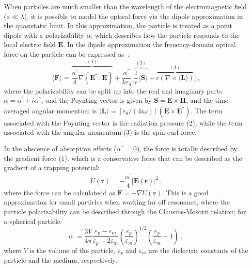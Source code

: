 When particles are much smaller than the wavelength of the electromagnetic field ($s\ll \lambda$), it is possible to model the optical force via the dipole approximation in the
quasistatic limit. In this approximation, the particle is treated as a point dipole with a polarizability $\alpha$, which describes how the particle responds to the local electric field $\mathbf{E}$.
In the dipole approximation the freuency-domain optical force on the particle can be expressed as~\cite{novotny}:
\begin{equation}
    \langle\mathbf{F}\rangle=\overbrace{\frac{\alpha^{\prime}}{4} \nabla\left\{\mathbf{E}^* \cdot \mathbf{E}\right\}}^{(1)}
    +\frac{\alpha^{\prime \prime}}{k \varepsilon_0} \Big[\overbrace{\frac{1}{c}\langle \mathbf{S} \rangle}^{(2)} + \overbrace{c \left( \nabla \times \langle \mathbf{L} \rangle \right)}^{(3)}\Big]\,,
\end{equation}
where the polarizability can be split up into the real and imaginary parts 
$\alpha=\alpha^\prime + i \alpha^{\prime \prime}$, and the Poynting vector is given by $\mathbf{S} = \mathbf{E} \times \mathbf{H}$, and the time-averaged angular momentum is 
$\langle \mathbf{L} \rangle = [\varepsilon_0/(4 i \omega)](\mathbf{E} \times \mathbf{E}^*)$. 
The term associated with the Poynting vector is the radiation pressure ($2$), while the term associated 
with the angular momentum ($3$) is the spin-curl force.

In the abscence of absorption effects ($\alpha^{\prime \prime}=0$), the force is totally described 
by the gradient force ($1$), which is a conservative force that can be described as the gradient 
of a trapping potential:
\begin{equation*}
    U (\mathbf{r}) = -\frac{\alpha^{\prime}}{4} \left|\mathbf{E}(\mathbf{r})\right|^2\,.
\end{equation*}
where the force can be calculatedd as $\mathbf{F} = -\nabla U(\mathbf{r})$. 
This is a good approximation for small particles
when working far off resonance, where the particle polarizability can be 
described through the Clausius-Mosotti relation; for a spherical particle:
\begin{equation}
    \alpha^{\prime}=\frac{3 V}{4 \pi} \frac{\varepsilon_p-\varepsilon_m}{\varepsilon_p+2 \varepsilon_m} \left(\frac{\varepsilon_p}{\varepsilon_m}\right)^{1 / 2} \left(\frac{\varepsilon_p}{\varepsilon_m}-1\right)\,,
\end{equation}
where $V$ is the volume of the particle, $\varepsilon_p$ and $\varepsilon_m$ are the
dielectric constants of the particle and the medium, respectively.

